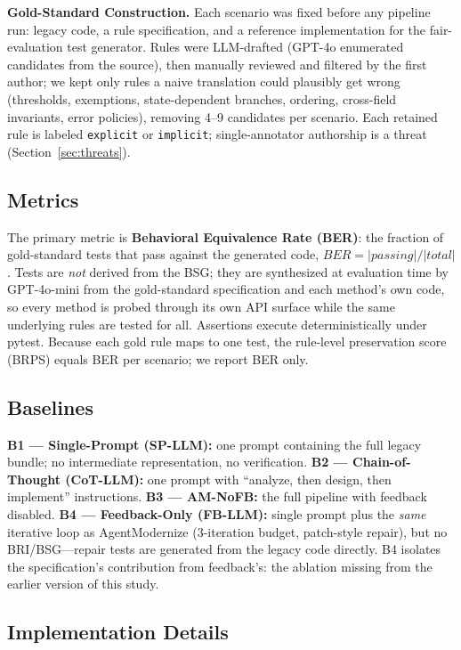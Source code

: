 \documentclass[conference]{IEEEtran}
\begin{document}
\textbf{Gold-Standard Construction.} Each scenario was fixed before any pipeline run: legacy code, a rule specification, and a reference implementation for the fair-evaluation test generator. Rules were LLM-drafted (GPT-4o enumerated candidates from the source), then manually reviewed and filtered by the first author; we kept only rules a naive translation could plausibly get wrong (thresholds, exemptions, state-dependent branches, ordering, cross-field invariants, error policies), removing 4--9 candidates per scenario. Each retained rule is labeled \texttt{explicit} or \texttt{implicit}; single-annotator authorship is a threat (Section~\ref{sec:threats}).

\subsection{Metrics}

The primary metric is \textbf{Behavioral Equivalence Rate (BER)}: the fraction of gold-standard tests that pass against the generated code, $BER = |passing|/|total|$. Tests are \emph{not} derived from the BSG; they are synthesized at evaluation time by GPT-4o-mini from the gold-standard specification and each method's own code, so every method is probed through its own API surface while the same underlying rules are tested for all. Assertions execute deterministically under pytest. Because each gold rule maps to one test, the rule-level preservation score (BRPS) equals BER per scenario; we report BER only.

\subsection{Baselines}

\textbf{B1 --- Single-Prompt (SP-LLM):} one prompt containing the full legacy bundle; no intermediate representation, no verification. \textbf{B2 --- Chain-of-Thought (CoT-LLM):} one prompt with ``analyze, then design, then implement'' instructions. \textbf{B3 --- AM-NoFB:} the full pipeline with feedback disabled. \textbf{B4 --- Feedback-Only (FB-LLM):} single prompt plus the \emph{same} iterative loop as AgentModernize (3-iteration budget, patch-style repair), but no BRI/BSG---repair tests are generated from the legacy code directly. B4 isolates the specification's contribution from feedback's: the ablation missing from the earlier version of this study.

\subsection{Implementation Details}
\end{document}
